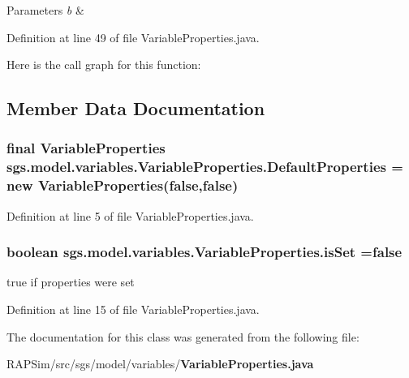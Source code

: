 \begin{DoxyParams}{Parameters}
{\em b} & \\
\hline
\end{DoxyParams}


Definition at line 49 of file Variable\-Properties.\-java.



Here is the call graph for this function\-:




\subsection{Member Data Documentation}
\subsubsection[{Default\-Properties}]{\setlength{\rightskip}{0pt plus 5cm}final {\bf Variable\-Properties} sgs.\-model.\-variables.\-Variable\-Properties.\-Default\-Properties = new {\bf Variable\-Properties}(false,false)\hspace{0.3cm}{\ttfamily [static]}}\label{classsgs_1_1model_1_1variables_1_1_variable_properties_a36125602dd07579c92ea34a8bb8f704d}


Definition at line 5 of file Variable\-Properties.\-java.

\subsubsection[{is\-Set}]{\setlength{\rightskip}{0pt plus 5cm}boolean sgs.\-model.\-variables.\-Variable\-Properties.\-is\-Set =false}\label{classsgs_1_1model_1_1variables_1_1_variable_properties_ad3e891d5dc335c8c4eae310054df624f}
true if properties were set 

Definition at line 15 of file Variable\-Properties.\-java.



The documentation for this class was generated from the following file\-:\begin{DoxyCompactItemize}
\item 
R\-A\-P\-Sim/src/sgs/model/variables/{\bf Variable\-Properties.\-java}\end{DoxyCompactItemize}
